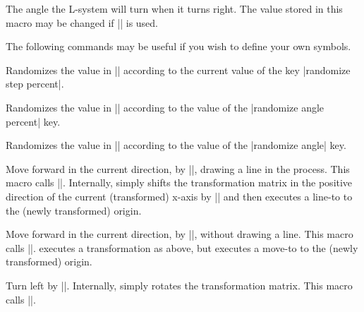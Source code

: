 \begin{command}{\pgfdeclarelindenmayersystem{}}
\begin{command}{\symbol{}}
\begin{command}{\pgflsystemcurrentrightangle}
	The angle the L-system will turn when it turns right.
	The value stored in this macro may be changed if
	|\pgflsystemrandomizerightangle| is used.
\end{command}


The following commands may be useful if you wish to define your own
symbols.

\begin{command}{\pgflsystemrandomizestep}
  Randomizes the value in |\pgflsystemcurrentstep| according to the
  current value of the key |randomize step percent|.
\end{command}

\begin{command}{\pgflsystemrandomizeleftangle}
	Randomizes the value in |\pgflsystemcurrentleftangle| according to
	the value of the |randomize angle percent| key.
\end{command}

\begin{command}{\pgflsystemrandomizerightangle}
	Randomizes the value in |\pgflsystemcurrentrightangle| according
	to the value of	the |randomize angle| key.
\end{command}

\begin{command}{\pgflsystemdrawforward}
	Move forward in the current direction, by |\pgflsystemcurrentstep|,
	drawing a line in the process. This macro calls
	|\pgflsystemrandomizestep|. Internally, \pgfname{} simply
	shifts the transformation matrix in the positive direction of
	the current (transformed) x-axis by |\pgflsystemstep|
	and then executes a line-to to the (newly transformed) origin.
\end{command}

\begin{command}{\pgflsystemmoveforward}
	Move forward in the current direction, by |\pgflsystemcurrentstep|,
	without drawing a line. This macro calls
	|\pgflsystemrandomizestep|. \pgfname{} executes a transformation
	as above, but executes a move-to to the (newly transformed)
	origin.
\end{command}

\begin{command}{\pgflsystemturnleft}
  Turn left by |\pgflsystemcurrentleftangle|. Internally, \pgfname{}
	simply rotates the transformation matrix. This macro calls
	|\pgflsystemrandomizeleftangle|.
\end{command}


\end{command}
\end{command}
